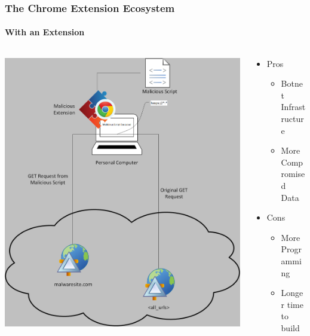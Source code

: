 \documentclass[aspectratio=169]{beamer}
\begin{document}
\begin{frame}
  \frametitle{The Chrome Extension Ecosystem}
  \framesubtitle{With an Extension}
  \begin{columns}
    \begin{column}{0.5\textwidth}
      \includegraphics[scale=0.33]{cors_extension}
    \end{column}
    \begin{column}{0.5\textwidth}
      \begin{itemize}
      \item Pros
        \begin{itemize}
        \item Botnet Infrastructure
        \item More Compromised Data
        \end{itemize}
        \item Cons
          \begin{itemize}
          \item More Programming
          \item Longer time to build
        \end{itemize}
      \end{itemize}
    \end{column}
  \end{columns}
\end{frame}
\end{document}
